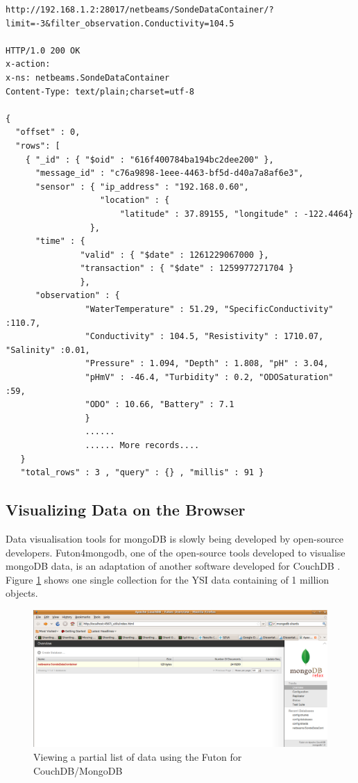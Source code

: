 \lstset{label=cmd:mongo-rest-request,caption=REST HTTP Interface Example}
\begin{lstlisting}
http://192.168.1.2:28017/netbeams/SondeDataContainer/?limit=-3&filter_observation.Conductivity=104.5

HTTP/1.0 200 OK
x-action:
x-ns: netbeams.SondeDataContainer
Content-Type: text/plain;charset=utf-8

{
  "offset" : 0,
  "rows": [
    { "_id" : { "$oid" : "616f400784ba194bc2dee200" }, 
      "message_id" : "c76a9898-1eee-4463-bf5d-d40a7a8af6e3", 
      "sensor" : { "ip_address" : "192.168.0.60", 
                   "location" : {
                       "latitude" : 37.89155, "longitude" : -122.4464} 
                 }, 
      "time" : { 
               "valid" : { "$date" : 1261229067000 },
               "transaction" : { "$date" : 1259977271704 } 
               },
      "observation" : { 
                "WaterTemperature" : 51.29, "SpecificConductivity" :110.7,
                "Conductivity" : 104.5, "Resistivity" : 1710.07, "Salinity" :0.01, 
                "Pressure" : 1.094, "Depth" : 1.808, "pH" : 3.04,
                "pHmV" : -46.4, "Turbidity" : 0.2, "ODOSaturation" :59, 
                "ODO" : 10.66, "Battery" : 7.1 
                } 
                ......
                ...... More records....
   } 
   "total_rows" : 3 , "query" : {} , "millis" : 91 }
\end{lstlisting}

\subsection{Visualizing Data on the Browser}

Data visualisation tools for mongoDB is slowly being developed by open-source
developers. Futon4mongodb, one of the open-source tools developed to visualise
mongoDB data, is an adaptation of another software developed for CouchDB
\cite{couchdb}. Figure \ref{fig:view-collections-instance-browser-futondb}
shows one single collection for the YSI data containing of 1 million objects.

\begin{figure}[h]
  \centering
  \includegraphics[scale=0.6]{../diagrams/view-collections-instance-browser-futondb}
  \caption{Viewing a partial list of data using the Futon for CouchDB/MongoDB}
  \label{fig:view-collections-instance-browser-futondb}
\end{figure}

